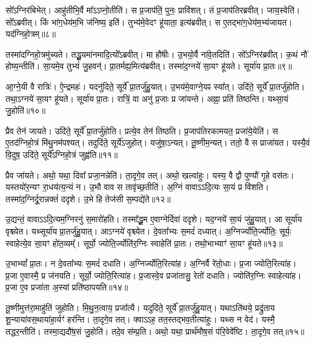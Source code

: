 सो᳚ऽग्निर॑बिभेत्।
आहु॑तीभि॒र्वै मा᳚\-ऽऽप्नो॒तीति॑।
स प्र॒जा\-प॑तिं॒ पुनः॒ प्रावि॑शत्।
तं प्र॒जा\-प॑तिरब्रवीत्।
जाय॒स्वेति॑।
सो᳚ऽब्रवीत्।
किं भा॑ग॒धेय॑म॒भि ज॑निष्य॒ इति॑।
तुभ्य॑मे॒वेदꣳ हू॑याता॒ इत्य॑ब्रवीत्।
स ए॒तद्भा॑ग॒धेय॑म॒भ्य॑जायत।
यद॑ग्निहो॒त्रम्॥८॥

तस्मा॑दग्निहो॒त्रमु॑च्यते।
तद्धू॒यमा॑नमादि॒त्यो᳚\-ऽब्रवीत्।
मा हौ॑षीः।
उ॒भयो॒र्वै ना॑वे॒तदिति॑।
सो᳚ऽग्निर॑ब्रवीत्।
क॒थं नौ॑ होष्य॒न्तीति॑।
सा॒यमे॒व तुभ्यं॑ जु॒हवन्॑।
प्रा॒तर्मह्य॒मित्य॑ब्रवीत्।
तस्मा॑द॒ग्नये॑ सा॒यꣳ हू॑यते।
सूर्या॑य प्रा॒तः॥९॥

आ॒ग्ने॒यी वै रात्रिः॑।
ऐ॒न्द्रमहः॑।
यदनु॑दिते॒ सूर्ये᳚ प्रा॒तर्जु॑हु॒यात्।
उ॒भय॑मे॒वाग्ने॒यꣴ स्या᳚त्।
उदि॑ते॒ सूर्ये᳚ प्रा॒तर्जु॑होति।
तथा॒ऽग्नये॑ सा॒यꣳ हू॑यते।
सूर्या॑य प्रा॒तः।
रात्रिं॒ वा अनु॑ प्र॒जाः प्र जा॑यन्ते।
अह्ना॒ प्रति॑ तिष्ठन्ति।
यथ्सा॒यं जु॒होति॑॥१०॥

प्रैव तेन॑ जायते।
उदि॑ते॒ सूर्ये᳚ प्रा॒तर्जु॑होति।
प्रत्ये॒व तेन॑ तिष्ठति।
प्र॒जा\-प॑तिरकामयत॒ प्रजा॑ये॒येति॑।
स ए॒तद॑ग्निहो॒त्रं मि॑थु॒नम॑पश्यत्।
तदुदि॑ते॒ सूर्ये॑\-ऽजुहोत्।
यजु॑षा॒\-ऽन्यत्।
तू॒ष्णीम॒न्यत्।
ततो॒ वै स प्राजा॑यत।
यस्यै॒वं वि॒दुष॒ उदि॑ते॒ सूर्ये᳚\-ऽग्निहो॒त्रं जुह्व॑ति॥११॥

प्रैव जा॑यते।
अथो॒ यथा॒ दिवा᳚ प्रजा॒नन्नेति॑।
ता॒दृगे॒व तत्।
अथो॒ खल्वा॑हुः।
यस्य॒ वै द्वौ पुण्यौ॑ गृ॒हे वस॑तः।
यस्तयो॑र॒न्यꣳ रा॒धय॑त्य॒न्यं न।
उ॒भौ वाव स तावृ॑च्छ॒तीति॑।
अ॒ग्निं वावा\-ऽऽदि॒त्यः सा॒यं प्र वि॑शति।
तस्मा॑द॒ग्निर्दू॒रान्नक्तं॑ ददृशे।
उ॒भे हि तेज॑सी स॒म्पद्ये॑ते॥१२॥

उ॒द्यन्तं॒ वावा\-ऽऽदि॒त्यम॒ग्निरनु॑\- स॒मारो॑हति।
तस्मा᳚द्धू॒म ए॒वाग्नेर्दिवा॑ ददृशे।
यद॒ग्नये॑ सा॒यं जु॑हु॒यात्।
आ सूर्या॑य वृश्च्येत।
यथ्सूर्या॑य प्रा॒तर्जु॑हु॒यात्।
आऽग्नये॑ वृश्च्येत।
दे॒वता᳚भ्यः स॒मदं॑ दध्यात्।
अ॒ग्निर्ज्योति॒र्ज्योतिः॒ सूर्यः॒ स्वाहेत्ये॒व सा॒यꣳ हो॑त॒व्यम्᳚।
सूर्यो॒ ज्योति॒र्ज्योति॑र॒ग्निः स्वाहेति॑ प्रा॒तः।
तथो॒भाभ्याꣳ॑ सा॒यꣳ हू॑यते॥१३॥

उ॒भाभ्यां᳚ प्रा॒तः।
न दे॒वता᳚भ्यः स॒मदं॑ दधाति।
अ॒ग्निर्ज्योति॒\-रित्या॑ह।
अ॒ग्निर्वै रे॑तो॒धाः।
प्र॒जा ज्योति॒रित्या॑ह।
प्र॒जा ए॒वास्मै॒ प्र ज॑नयति।
सूर्यो॒ ज्योति॒रित्या॑ह।
प्र॒जास्वे॒व प्रजा॑तासु॒ रेतो॑ दधाति।
ज्योति॑र॒ग्निः स्वाहेत्या॑ह।
प्र॒जा ए॒व प्रजा॑ता अ॒स्यां प्रति॑\-ष्ठापयति॥१४॥

तू॒ष्णीमुत्त॑रा॒माहु॑तिं जुहोति।
मि॒थु॒न॒त्वाय॒ प्रजा᳚त्यै।
यदुदि॑ते॒ सूर्ये᳚ प्रा॒तर्जु॑हु॒यात्।
यथाऽति॑थये॒ प्रद्रु॑ताय शू॒न्याया॑वस॒थाया॑हा॒र्यꣳ॑ हर॑न्ति।
ता॒दृगे॒व तत्।
क्वाऽऽह॒ तत॒स्तद्भव॒तीत्या॑हुः।
यथ्स न वेद॑।
यस्मै॒ तद्धर॒न्तीति॑।
तस्मा॒द्यदौ॑ष॒सं जु॒होति॑।
तदे॒व स॑म्प्र॒ति।
अथो॒ यथा॒ प्रार्थ॑मौष॒सं प॑रि॒वेवे᳚ष्टि।
ता॒दृगे॒व तत्॥१५॥\anuvakamend[अ॒मृ॒ष्ट॒ वि॒चि॒किथ्स॑ति॒ जुह्व॑त्य॒जाम॑\-सृजताग्निहो॒त्रꣳ सूर्या॑य प्रा॒तर्जु॒होति॒ जुह्व॑ति स॒म्पद्ये॑ते हूयते स्थापयति सम्प्र॒ति द्वे च॑]

